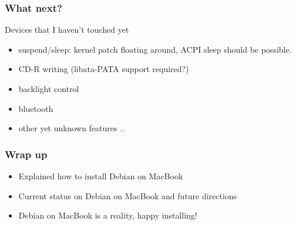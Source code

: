 \documentclass[cjk,dvipdfmx]{beamer}
\begin{document}
\begin{frame}
\frametitle{What next?}
Devices that I haven't touched yet
\begin{itemize}
 \item suspend/sleep: kernel patch floating around, ACPI sleep should be possible.
 \item CD-R writing (libata-PATA support required?)
 \item backlight control
 \item bluetooth
 \item other yet unknown features ..
\end{itemize}
\end{frame}

\begin{frame}
\frametitle{Wrap up}
\begin{itemize}[<+->]
 \item Explained how to install Debian on MacBook
 \item Current status on Debian on MacBook and future directions
 \item Debian on MacBook is a reality, happy installing!
\end{itemize}
\end{frame}
\end{document}
